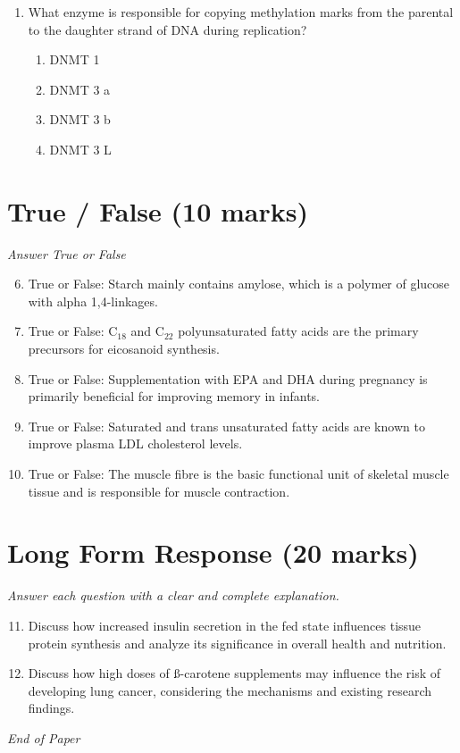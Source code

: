 \documentclass[12pt]{article}
\begin{document}
\begin{enumerate}[label=\arabic*.]
\begin{enumerate}[label=(\alph*)]
    \item Obesity, excess energy intake, normal growth and hypoinsulinaemia
    \item Obesity, abnormal growth, hypothyroidism, hyperinsulinaemia
    \item Underweight, abnormal growth, hypothyroidism, hyperinsulinaemia
\end{enumerate}
\item What enzyme is responsible for copying methylation marks from the parental to the daughter strand of DNA during replication?
\begin{enumerate}[label=(\alph*)]
    \item DNMT 1
    \item DNMT 3 a
    \item DNMT 3 b
    \item DNMT 3 L
\end{enumerate}
\end{enumerate}

\section*{True / False (10 marks)}
\textit{Answer True or False}
\begin{enumerate}[label=\arabic*.]
\setcounter{enumi}{5}
\item True or False: Starch mainly contains amylose, which is a polymer of glucose with alpha 1,4-linkages.
\item True or False: C$_{18}$ and C$_{22}$ polyunsaturated fatty acids are the primary precursors for eicosanoid synthesis.
\item True or False: Supplementation with EPA and DHA during pregnancy is primarily beneficial for improving memory in infants.
\item True or False: Saturated and trans unsaturated fatty acids are known to improve plasma LDL cholesterol levels.
\item True or False: The muscle fibre is the basic functional unit of skeletal muscle tissue and is responsible for muscle contraction.
\end{enumerate}

\section*{Long Form Response (20 marks)}
\textit{Answer each question with a clear and complete explanation.}
\begin{enumerate}[label=\arabic*.]
\setcounter{enumi}{10}
\item Discuss how increased insulin secretion in the fed state influences tissue protein synthesis and analyze its significance in overall health and nutrition.
\item Discuss how high doses of ß-carotene supplements may influence the risk of developing lung cancer, considering the mechanisms and existing research findings.
\end{enumerate}

\vfill
\noindent\textit{End of Paper}
\end{document}
